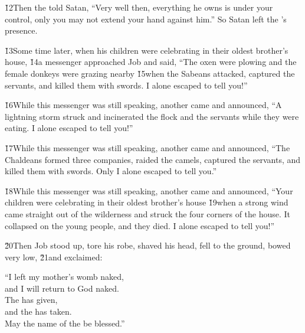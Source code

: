 \v{12}Then the  told Satan, ``Very well then, everything he owns is under your control, only you may not extend your hand against him.'' So Satan left the 's presence.

\v{13}Some time later, when his children were celebrating in their oldest brother's house, \v{14}a messenger approached Job and said, ``The oxen were plowing and the female donkeys were grazing nearby \v{15}when the Sabeans attacked, captured the servants, and killed them with swords. I alone escaped to tell you!''

\v{16}While this messenger was still speaking, another came and announced, ``A lightning storm struck and incinerated the flock and the servants while they were eating. I alone escaped to tell you!''

\v{17}While this messenger was still speaking, another came and announced, ``The Chaldeans formed three companies, raided the camels, captured the servants, and killed them with swords. Only I alone escaped to tell you.''

\v{18}While this messenger was still speaking, another came and announced, ``Your children were celebrating in their oldest brother's house \v{19}when a strong wind came straight out of the wilderness and struck the four corners of the house. It collapsed on the young people, and they died. I alone escaped to tell you!''

\v{20}Then Job stood up, tore his robe, shaved his head, fell to the ground, bowed very low, \v{21}and exclaimed:

\begin{poetry}
\poeml ``I left my mother's womb naked, \\
\poemll    and I will return to God naked. \\
\poeml The  has given, \\
\poemll    and the  has taken. \\
\poemlll       May the name of the  be blessed.''
\end{poetry}

